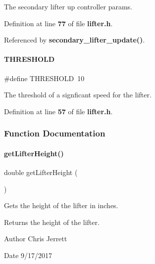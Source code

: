 The secondary lifter up controller params. 



Definition at line \textbf{ 77} of file \textbf{ lifter.\+h}.



Referenced by \textbf{ secondary\+\_\+lifter\+\_\+update()}.

\mbox{\label{lifter_8h_a4679d8ea8690999a6c6c7c0cb245c879}} 
\paragraph{T\+H\+R\+E\+S\+H\+O\+LD}
{\footnotesize\ttfamily \#define T\+H\+R\+E\+S\+H\+O\+LD~10}



The threshold of a signficant speed for the lifter. 



Definition at line \textbf{ 57} of file \textbf{ lifter.\+h}.



\subsubsection{Function Documentation}
\mbox{\label{lifter_8h_a2719740958fd8a5926f88f6194e820e3}} 
\paragraph{get\+Lifter\+Height()}
{\footnotesize\ttfamily double get\+Lifter\+Height (\begin{DoxyParamCaption}{ }\end{DoxyParamCaption})}



Gets the height of the lifter in inches. 

\begin{DoxyReturn}{Returns}
the height of the lifter. 
\end{DoxyReturn}
\begin{DoxyAuthor}{Author}
Chris Jerrett 
\end{DoxyAuthor}
\begin{DoxyDate}{Date}
9/17/2017 
\end{DoxyDate}


